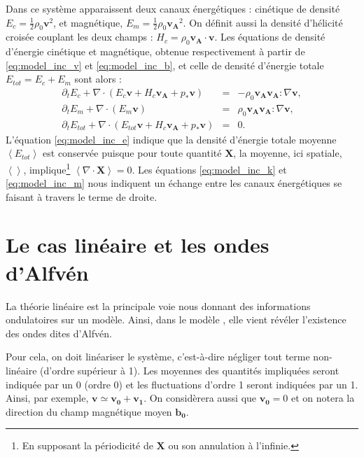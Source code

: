  Dans ce système apparaissent deux canaux énergétiques : cinétique de densité $E_c = \frac{1}{2} \rho_0 \boldsymbol{v}^2$, et magnétique, $E_m = \frac{1}{2} \rho_0 \boldsymbol{v_A}^2$. On définit aussi la densité d'hélicité croisée couplant les deux champs : $H_c = \rho_0 \boldsymbol{v_A} \cdot \boldsymbol{v}$. Les équations de densité d'énergie cinétique et magnétique, obtenue respectivement à partir de \eqref{eq:model_inc_v} et  \eqref{eq:model_inc_b}, et celle de densité d'énergie totale $E_{tot} = E_c + E_m$ sont alors : 
 \begin{eqnarray}
  \label{eq:model_inc_k} \partial_t E_c +   \nabla  \cdot (E_c \boldsymbol{v}+ H_c \boldsymbol{v_A} + p_* \boldsymbol{v}  )  &=& - \rho_0  \boldsymbol{v_A} \boldsymbol{v_A} : \nabla \boldsymbol{v}, \\
  \label{eq:model_inc_m} \partial_t E_m +   \nabla  \cdot (E_m \boldsymbol{v}) &=& \rho_0   \boldsymbol{v_A} \boldsymbol{v_A} : \nabla \boldsymbol{v} ,\\
 \label{eq:model_inc_e} \partial_t E_{tot} +   \nabla  \cdot (E_{tot} \boldsymbol{v} + H_c \boldsymbol{v_A} + p_* \boldsymbol{v} )  &=&  0.
 \end{eqnarray}
 L'équation \eqref{eq:model_inc_e} indique que la densité d'énergie totale moyenne $\left<E_{tot}\right>$ est conservée puisque pour toute quantité $\boldsymbol{X}$, la moyenne, ici spatiale, $\left<\right>$, implique\footnote{En supposant la périodicité de $\boldsymbol{X}$ ou son annulation à l'infinie.} $\left<\nabla \cdot \boldsymbol{X}\right> = 0$. Les équations \eqref{eq:model_inc_k} et \eqref{eq:model_inc_m} nous indiquent un échange entre les canaux énergétiques se faisant à travers le terme de droite. 
 
 
\section{Le cas linéaire et les ondes d'Alfvén}\label{sec-112}
 

 La théorie linéaire est la principale voie nous donnant des informations ondulatoires sur un modèle. Ainsi, dans le modèle , elle vient révéler l'existence des ondes dites d'Alfvén. 

 Pour cela, on doit linéariser le système, c'est-à-dire négliger tout terme non-linéaire (d'ordre supérieur à 1). 
 Les moyennes des quantités impliquées seront indiquée par un 0 (ordre 0) et les fluctuations d'ordre 1 seront indiquées par un 1. Ainsi, par exemple, $\boldsymbol{v} \simeq \boldsymbol{v_{0}} + \boldsymbol{v_{1}}$. On considèrera aussi que $\boldsymbol{v_{0}} = 0$ et on notera la direction du champ magnétique moyen $\boldsymbol{b_0}$. 
 
